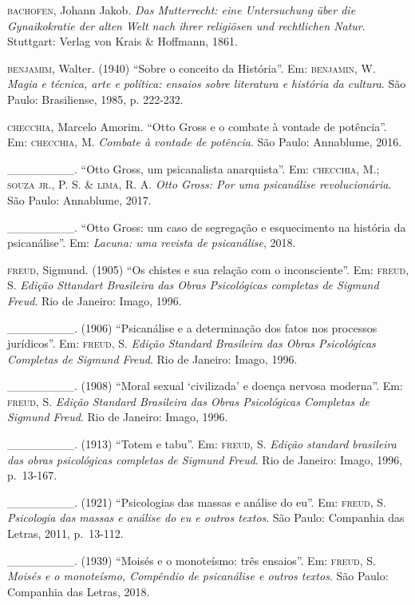 \begin{Parskip}
\textsc{bachofen}, Johann Jakob. \emph{Das Mutterrecht: eine Untersuchung über die Gynaikokratie der alten Welt nach ihrer religiösen und rechtlichen Natur}. Stuttgart: Verlag von Krais \& Hoffmann, 1861.

\textsc{benjamim}, Walter. (1940) ``Sobre o conceito da História''. Em: \textsc{benjamin}, W. \emph{Magia e técnica, arte e política: ensaios sobre literatura e história da cultura}. São Paulo: Brasiliense, 1985, p. 222-232.

\textsc{checchia}, Marcelo Amorim. ``Otto Gross e o combate à vontade de potência''. Em: \textsc{checchia}, M. \emph{Combate à vontade de potência}. São Paulo: Annablume, 2016.

\_\_\_\_\_\_\_\_. ``Otto Gross, um psicanalista anarquista''. Em: \textsc{checchia}, M.; \textsc{souza jr.}, P. S. \& \textsc{lima}, R. A. \emph{Otto Gross: Por uma psicanálise revolucionária}. São Paulo: Annablume, 2017.

\_\_\_\_\_\_\_\_. ``Otto Gross: um caso de segregação e esquecimento na história da psicanálise''. Em: \emph{Lacuna: uma revista de psicanálise}, 2018.

\textsc{freud}, Sigmund. (1905) ``Os chistes e sua relação com o inconsciente''. Em: \textsc{freud}, S. \emph{Edição Sttandart Brasileira das Obras Psicológicas completas de Sigmund Freud}. Rio de Janeiro: Imago, 1996.

\_\_\_\_\_\_\_\_. (1906) ``Psicanálise e a determinação dos fatos nos processos jurídicos''. Em: \textsc{freud}, S. \emph{Edição Standard Brasileira das Obras Psicológicas Completas de Sigmund Freud}. Rio de Janeiro: Imago, 1996.

\_\_\_\_\_\_\_\_. (1908) ``Moral sexual `civilizada' e doença nervosa moderna''. Em: \textsc{freud}, S. \emph{Edição Standard Brasileira das Obras Psicológicas Completas de Sigmund Freud}. Rio de Janeiro: Imago, 1996.

\_\_\_\_\_\_\_\_. (1913) ``Totem e tabu''. Em: \textsc{freud}, S. \emph{Edição standard brasileira das obras psicológicas completas de Sigmund Freud}. Rio de Janeiro: Imago, 1996, p.~13-167.

\_\_\_\_\_\_\_\_. (1921) ``Psicologias das massas e análise do eu''. Em: \textsc{freud}, S. \emph{Psicologia das massas e análise do eu e outros textos}. São Paulo: Companhia das Letras, 2011, p.~13-112.

\_\_\_\_\_\_\_\_. (1939) ``Moisés e o monoteísmo: três ensaios''. Em: \textsc{freud}, S. \emph{Moisés e o monoteísmo, Compêndio de psicanálise e outros textos}. São Paulo: Companhia das Letras, 2018.


\end{Parskip}
